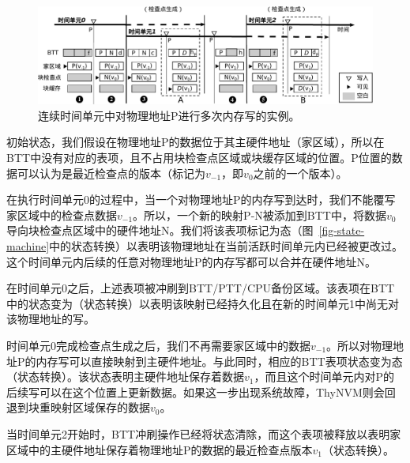 \begin{itemize}
\begin{figure}[!ht]
\centering
\includegraphics[width=\linewidth]{figures/example.pdf}
\caption{连续时间单元中对物理地址P进行多次内存写的实例。}
\label{fig-example}
\end{figure}

\vspace{\noindentsep}
\noindent{} 初始状态，我们假设在物理地址P的数据位于其主硬件地址（家区域），所以在BTT中没有对应的表项，且不占用块检查点区域或块缓存区域的位置。P位置的数据可以认为是最近检查点的版本（标记为$v_{-1}$，即$v_0$之前的一个版本）。

\vspace{\noindentsep}
\noindent{} 在执行时间单元0的过程中，当一个对物理地址P的内存写到达时，我们不能覆写家区域中的检查点数据$v_{-1}$。所以，一个新的映射P-N被添加到BTT中，将数据$v_0$导向块检查点区域中的硬件地址N。我们将该表项标记为态（图~\ref{fig-state-machine}中的状态转换）以表明该物理地址在当前活跃时间单元内已经被更改过。这个时间单元内后续的任意对物理地址P的内存写都可以合并在硬件地址N。

\vspace{\noindentsep}
\noindent{} 在时间单元0之后，上述表项被冲刷到BTT/PTT/CPU备份区域。该表项在BTT中的状态变为（状态转换）以表明该映射已经持久化且在新的时间单元1中尚无对该物理地址的写。

\vspace{\noindentsep}
\noindent{} 时间单元0完成检查点生成之后，我们不再需要家区域中的数据$v_{-1}$。所以对物理地址P的内存写可以直接映射到主硬件地址。与此同时，相应的BTT表项状态变为态（状态转换）。该状态表明主硬件地址保存着数据$v_1$，而且这个时间单元内对P的后续写可以在这个位置上更新数据。如果这一步出现系统故障，ThyNVM则会回退到块重映射区域保存的数据$v_{0}$。

\vspace{\noindentsep}
\noindent{} 当时间单元2开始时，BTT冲刷操作已经将状态清除，而这个表项被释放以表明家区域中的主硬件地址保存着物理地址P的数据的最近检查点版本$v_1$（状态转换）。


\end{itemize}
